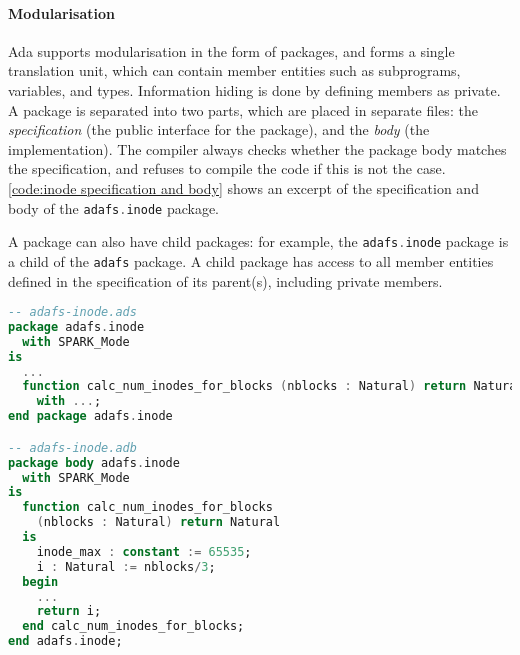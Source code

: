 \paragraph{Modularisation}
Ada supports modularisation in the form of packages, and forms a single translation unit, which can contain member entities such as subprograms, variables, and types.
Information hiding is done by defining members as private.
A package is separated into two parts, which are placed in separate files: the \textit{specification} (the public interface for the package), and the \textit{body} (the implementation).
The compiler always checks whether the package body matches the specification, and refuses to compile the code if this is not the case.
\autoref{code:inode specification and body} shows an excerpt of the specification and body of the \lstinline[language=Ada]{adafs.inode} package.

A package can also have child packages: for example, the \lstinline[language=Ada]{adafs.inode} package is a child of the \lstinline[language=Ada]{adafs} package.
A child package has access to all member entities defined in the specification of its parent(s), including private members.

\begin{lstlisting}[float=tb,caption={Excerpt from the adafs.inode package specification and body (ellipses denote code omitted for brevity)}, label={code:inode specification and body}, language=Ada]
-- adafs-inode.ads
package adafs.inode
  with SPARK_Mode
is
  ...
  function calc_num_inodes_for_blocks (nblocks : Natural) return Natural
    with ...;
end package adafs.inode

-- adafs-inode.adb
package body adafs.inode
  with SPARK_Mode
is
  function calc_num_inodes_for_blocks
    (nblocks : Natural) return Natural
  is
    inode_max : constant := 65535;
    i : Natural := nblocks/3;
  begin
    ...
    return i;
  end calc_num_inodes_for_blocks;
end adafs.inode;
\end{lstlisting}

